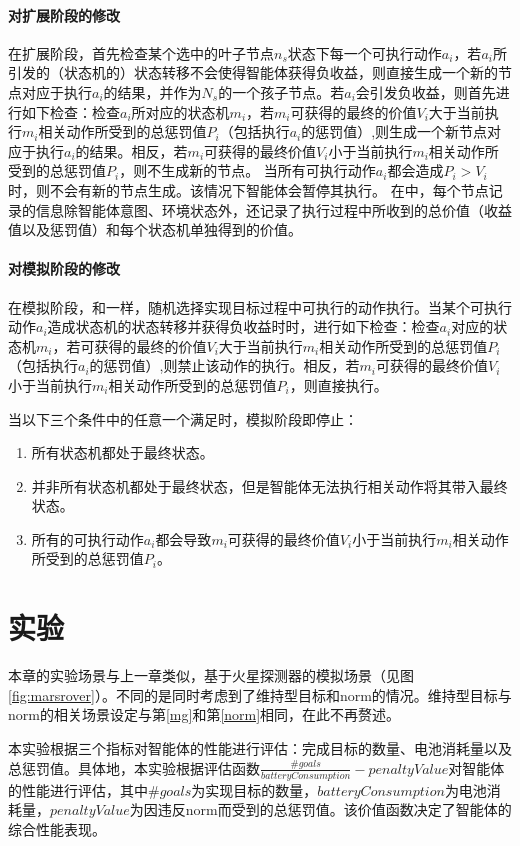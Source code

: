 \paragraph{对扩展阶段的修改}
在扩展阶段，\SAT 首先检查某个选中的叶子节点$n_s$状态下每一个可执行动作$a_i$，若$a_i$所引发的（状态机的）状态转移不会使得智能体获得负收益，则直接生成一个新的节点对应于执行$a_i$的结果，并作为$N_s$的一个孩子节点。若$a_i$会引发负收益，则首先进行如下检查：检查$a_i$所对应的状态机$m_i$，若$m_i$可获得的最终的价值$V_i$大于当前执行$m_i$相关动作所受到的总惩罚值$P_i$（包括执行$a_i$的惩罚值）,则生成一个新节点对应于执行$a_i$的结果。相反，若$m_i$可获得的最终价值$V_i$小于当前执行$m_i$相关动作所受到的总惩罚值$P_i$，则不生成新的节点。
%
当所有可执行动作$a_i$都会造成$P_i > V_i$时，则不会有新的节点生成。该情况下智能体会暂停其执行。
%
在\SAT 中，每个节点记录的信息除智能体意图、环境状态外，还记录了执行过程中所收到的总价值（收益值以及惩罚值）和每个状态机单独得到的价值。

\paragraph{对模拟阶段的修改}
在模拟阶段，\SAT 和\SA 一样，随机选择实现目标过程中可执行的动作执行。当某个可执行动作$a_i$造成状态机的状态转移并获得负收益时时，进行如下检查：检查$a_i$对应的状态机$m_i$，若可获得的最终的价值$V_i$大于当前执行$m_i$相关动作所受到的总惩罚值$P_i$（包括执行$a_i$的惩罚值）,则禁止该动作的执行。相反，若$m_i$可获得的最终价值$V_i$小于当前执行$m_i$相关动作所受到的总惩罚值$P_i$，则直接执行。

当以下三个条件中的任意一个满足时，模拟阶段即停止：
\begin{enumerate}
  \item 所有状态机都处于最终状态。
  \item 并非所有状态机都处于最终状态，但是智能体无法执行相关动作将其带入最终状态。
  \item 所有的可执行动作$a_i$都会导致$m_i$可获得的最终价值$V_i$小于当前执行$m_i$相关动作所受到的总惩罚值$P_i$。
\end{enumerate}

\section{实验}
本章的实验场景与上一章类似，基于火星探测器的模拟场景（见图\ref{fig:marsrover}）。不同的是同时考虑到了维持型目标和norm的情况。维持型目标与norm的相关场景设定与第\ref{mg}和第\ref{norm}相同，在此不再赘述。

本实验根据三个指标对智能体的性能进行评估：完成目标的数量、电池消耗量以及总惩罚值。具体地，本实验根据评估函数$\frac{\#goals}{batteryConsumption} - penaltyValue$对智能体的性能进行评估，其中$\#goals$为实现目标的数量，$batteryConsumption$为电池消耗量，$penaltyValue$为因违反norm而受到的总惩罚值。该价值函数决定了智能体的综合性能表现。

